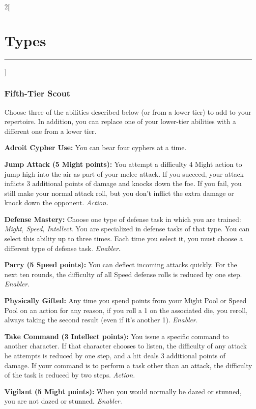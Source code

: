 \documentclass[a4paper,10pt,final]{book}
\newcommand{\HRule}{\rule{\linewidth}{0.5mm}} %
\newcommand{\newSection}[1]{\section*{#1} \addcontentsline{toc}{section}{#1} \label{sec:#1} \HRule}
\newcommand{\itemAbility}[2]{\textcolor{25gray}{\textbullet\textbf{ #1:}} {#2}\par}
\newcommand{\enabler}{\textit{ Enabler.}}
\newcommand{\action}{\textit{ Action.}}
\newenvironment{docsection}[1]
{
  \begin{multicols*}{2}[\newSection{#1}]
}
{
  \end{multicols*}
  \newpage
}
\begin{document}
\begin{docsection}{Types}
\subsubsection*{Fifth-Tier Scout}
\label{subsub:scoutFifthTier}
Choose three of the abilities described
below (or from a lower tier) to add to your
repertoire. In addition, you can replace one
of your lower-tier abilities with a different
one from a lower tier.\par
\itemAbility{Adroit Cypher Use}{You can bear four
cyphers at a time.}
\itemAbility{Jump Attack (5 Might points)}{You attempt
a difficulty 4 Might action to jump high into
the air as part of your melee attack. If you
succeed, your attack inflicts 3 additional
points of damage and knocks down the foe.
If you fail, you still make your normal attack
roll, but you don’t inflict the extra damage
or knock down the opponent.\action}
\itemAbility{Defense Mastery}{Choose one
type of defense task in which you are
trained: \textit{Might, Speed, Intellect}. You are
specialized in defense tasks of that type.
You can select this ability up to three times.
Each time you select it, you must choose a
different type of defense task.\enabler}
\itemAbility{Parry (5 Speed points)}{You can deflect
incoming attacks quickly. For the next ten
rounds, the difficulty of all Speed defense
rolls is reduced by one step.\enabler}
\itemAbility{Physically Gifted}{Any time you spend
points from your Might Pool or Speed Pool on
an action for any reason, if you roll a 1 on the
associated die, you reroll, always taking the
second result (even if it’s another 1).\enabler}
\itemAbility{Take Command (3 Intellect points)}{You issue a specific command to another
character. If that character chooses to listen,
the difficulty of any attack he attempts
is reduced by one step, and a hit deals
3 additional points of damage. If your
command is to perform a task other than an attack, the difficulty of the task is reduced by
two steps.\action}
\itemAbility{Vigilant (5 Might points)}{When you would
normally be dazed or stunned, you are not
dazed or stunned.\enabler}


\end{docsection}
\end{document}
